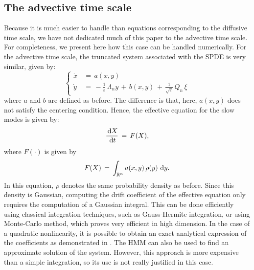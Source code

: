 \subsection{The advective time scale}
\label{sec:the_advective_time_scale}
Because it is much easier to handle than equations corresponding to the diffusive time scale, we have not dedicated much of this paper to the advective time scale.
For completeness, we present here how this case can be handled numerically.
For the advective time scale, the truncated system associated with the SPDE is very similar, given by:
\begin{equation}
    \left\{\begin{aligned} 
            \dot x\,&=\,a(x,y) \\
            \dot y\,&=\,-\frac 1 {\varepsilon}\, \Lambda_n y\,+\,b(x,y)\,+\,\frac 1{\sqrt \varepsilon}\,Q_n\,\xi
        \end{aligned} \right. 
\end{equation}
where $a$ and $b$ are defined as before. The difference is that, here, $a(x,y)$ does not satisfy the centering condition.
Hence, the effective equation for the slow modes is given by:
$$ \frac{\,\mathrm d X}{\,\mathrm d t}\,=\, F(X), $$
where $F(\cdot)$ is given by
$$ F(X) \,=\, \int_{\mathbb R^n} a(x,y) \, \rho(y)\, \,\mathrm d y.  $$
In this equation, $\rho$ denotes the same probability density as before. 
Since this density is Gaussian, computing the drift coefficient of the effective equation only requires the computation of a Gaussian integral.
This can be done efficiently using classical integration techniques, such as Gauss-Hermite integration, or using Monte-Carlo method, which proves very efficient in high dimension.
In the case of a quadratic nonlinearity, it is possible to obtain an exact analytical expression of the coefficients as demonstrated in \cite{abdulle2012numerical}.
The HMM can also be used to find an approximate solution of the system.
However, this approach is more expensive than a simple integration, so its use is not really justified in this case. 
